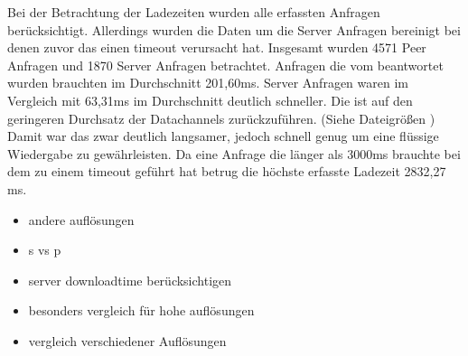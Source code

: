 Bei der Betrachtung der Ladezeiten wurden alle erfassten Anfragen berücksichtigt. Allerdings wurden die Daten um die Server Anfragen bereinigt bei denen zuvor das \pTp \cdn einen timeout verursacht hat. Insgesamt wurden 4571 Peer Anfragen und 1870 Server Anfragen betrachtet. 
Anfragen die vom \pTp \cdn beantwortet wurden brauchten im Durchschnitt 201,60ms. Server Anfragen waren im Vergleich mit 63,31ms im Durchschnitt deutlich schneller. Die ist auf den geringeren Durchsatz der \webrtc Datachannels zurückzuführen. (Siehe Dateigrößen ) Damit war das \pTp \cdn zwar deutlich langsamer, jedoch schnell genug um eine flüssige Wiedergabe zu gewährleisten. Da eine Anfrage die länger als 3000ms brauchte bei dem \pTp \cdn zu einem timeout geführt hat betrug die höchste erfasste Ladezeit 2832,27 ms.    
\begin{itemize}
	\item andere auflösungen
	\item s vs p
	\item server downloadtime berücksichtigen
	\item besonders vergleich für hohe auflösungen
	\item vergleich verschiedener Auflösungen
\end{itemize}
